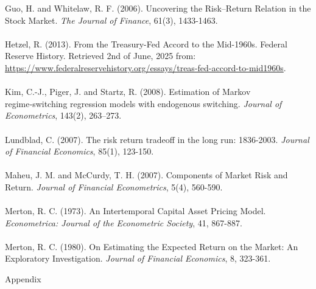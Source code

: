 \documentclass[12pt]{article}
\begin{document}
Guo, H. and Whitelaw, R. F. (2006).  Uncovering the Risk–Return Relation in the Stock Market. \textit{The Journal of Finance}, 61(3), 1433-1463.\\\\
Hetzel, R. (2013). From the Treasury-Fed Accord to the Mid-1960s. Federal Reserve History. Retrieved 2nd of June, 2025 from: \url{https://www.federalreservehistory.org/essays/treas-fed-accord-to-mid1960s}.\\\\
Kim, C.-J., Piger, J. and Startz, R. (2008). Estimation of Markov regime‑switching regression models with endogenous switching. \textit{Journal of Econometrics}, 143(2), 263–273.\\\\
Lundblad, C. (2007). The risk return tradeoff in the long run: 1836-2003. \textit{Journal of Financial Economics}, 85(1), 123-150.\\\\
Maheu, J. M. and McCurdy, T. H. (2007). Components of Market Risk and Return. \textit{Journal of Financial Econometrics}, 5(4), 560-590.\\\\
Merton, R. C. (1973). An Intertemporal Capital Asset Pricing Model. \textit{Econometrica: Journal of the Econometric Society}, 41, 867-887.\\\\
Merton, R. C. (1980). On Estimating the Expected Return on the Market: An Exploratory Investigation. \textit{Journal of Financial Economics}, 8, 323-361.\\

\newpage
{}
\vspace*{5cm}
\begin{center}
\huge{Appendix}
\end{center}
\newpage
\end{document}
